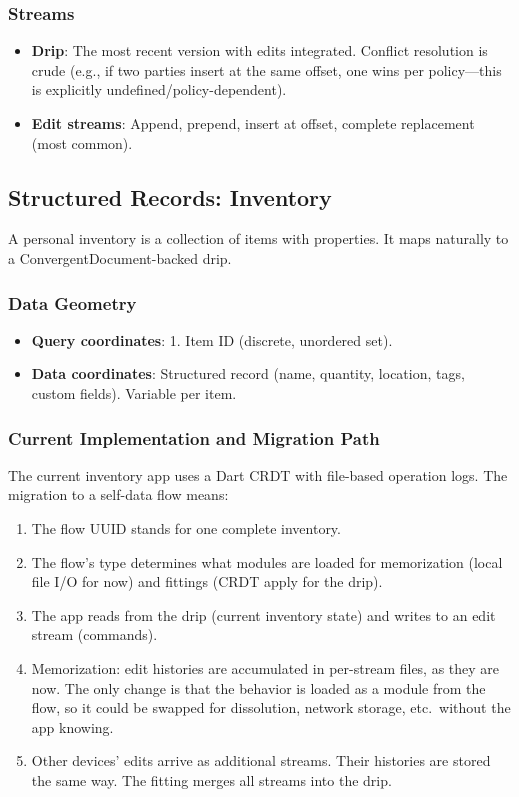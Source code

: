 \documentclass[11pt, letterpaper]{article}
\begin{document}
\subsubsection{Streams}
\begin{itemize}[leftmargin=2em]
  \item \textbf{Drip}: The most recent version with edits integrated. Conflict
    resolution is crude (e.g., if two parties insert at the same offset, one wins per
    policy---this is explicitly undefined/policy-dependent).
  \item \textbf{Edit streams}: Append, prepend, insert at offset, complete replacement
    (most common).
\end{itemize}

\subsection{Structured Records: Inventory}
\label{sec:ex-inventory}

A personal inventory is a collection of items with properties. It maps naturally to a
ConvergentDocument-backed drip.

\subsubsection{Data Geometry}
\begin{itemize}[leftmargin=2em]
  \item \textbf{Query coordinates}: 1. Item ID (discrete, unordered set).
  \item \textbf{Data coordinates}: Structured record (name, quantity, location, tags,
    custom fields). Variable per item.
\end{itemize}

\subsubsection{Current Implementation and Migration Path}

The current inventory app uses a Dart CRDT with file-based operation logs. The migration
to a self-data flow means:

\begin{enumerate}[leftmargin=2em]
  \item The flow UUID stands for one complete inventory.
  \item The flow's type determines what modules are loaded for memorization (local
    file I/O for now) and fittings (CRDT apply for the drip).
  \item The app reads from the drip (current inventory state) and writes to an edit
    stream (commands).
  \item Memorization: edit histories are accumulated in per-stream files, as they are
    now. The only change is that the behavior is loaded as a module from the flow,
    so it could be swapped for dissolution, network storage, etc.\ without the app
    knowing.
  \item Other devices' edits arrive as additional streams. Their histories are stored
    the same way. The fitting merges all streams into the drip.
\end{enumerate}
\end{document}
